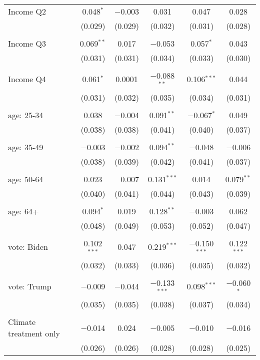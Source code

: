 \begin{tabular}{@{\extracolsep{5pt}}lccccc}
 Income Q2 & 0.048$^{*}$ & $-$0.003 & 0.031 & 0.047 & 0.028 \\ 
  & (0.029) & (0.029) & (0.032) & (0.031) & (0.028) \\ 
  & & & & & \\ 
 Income Q3 & 0.069$^{**}$ & 0.017 & $-$0.053 & 0.057$^{*}$ & 0.043 \\ 
  & (0.031) & (0.031) & (0.034) & (0.033) & (0.030) \\ 
  & & & & & \\ 
 Income Q4 & 0.061$^{*}$ & 0.0001 & $-$0.088$^{**}$ & 0.106$^{***}$ & 0.044 \\ 
  & (0.031) & (0.032) & (0.035) & (0.034) & (0.031) \\ 
  & & & & & \\ 
 age: 25-34 & 0.038 & $-$0.004 & 0.091$^{**}$ & $-$0.067$^{*}$ & 0.049 \\ 
  & (0.038) & (0.038) & (0.041) & (0.040) & (0.037) \\ 
  & & & & & \\ 
 age: 35-49 & $-$0.003 & $-$0.002 & 0.094$^{**}$ & $-$0.048 & $-$0.006 \\ 
  & (0.038) & (0.039) & (0.042) & (0.041) & (0.037) \\ 
  & & & & & \\ 
 age: 50-64 & 0.023 & $-$0.007 & 0.131$^{***}$ & 0.014 & 0.079$^{**}$ \\ 
  & (0.040) & (0.041) & (0.044) & (0.043) & (0.039) \\ 
  & & & & & \\ 
 age: 64+ & 0.094$^{*}$ & 0.019 & 0.128$^{**}$ & $-$0.003 & 0.062 \\ 
  & (0.048) & (0.049) & (0.053) & (0.052) & (0.047) \\ 
  & & & & & \\ 
 vote: Biden & 0.102$^{***}$ & 0.047 & 0.219$^{***}$ & $-$0.150$^{***}$ & 0.122$^{***}$ \\ 
  & (0.032) & (0.033) & (0.036) & (0.035) & (0.032) \\ 
  & & & & & \\ 
 vote: Trump & $-$0.009 & $-$0.044 & $-$0.133$^{***}$ & 0.098$^{***}$ & $-$0.060$^{*}$ \\ 
  & (0.035) & (0.035) & (0.038) & (0.037) & (0.034) \\ 
  & & & & & \\ 
 Climate treatment only & $-$0.014 & 0.024 & $-$0.005 & $-$0.010 & $-$0.016 \\ 
  & (0.026) & (0.026) & (0.028) & (0.028) & (0.025) \\ 

\end{tabular}
